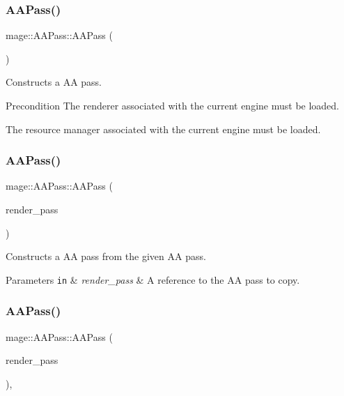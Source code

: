 \subsubsection{\texorpdfstring{A\+A\+Pass()}{AAPass()}\hspace{0.1cm}{\footnotesize\ttfamily [1/3]}}
{\footnotesize\ttfamily mage\+::\+A\+A\+Pass\+::\+A\+A\+Pass (\begin{DoxyParamCaption}{ }\end{DoxyParamCaption})}

Constructs a AA pass.

\begin{DoxyPrecond}{Precondition}
The renderer associated with the current engine must be loaded. 

The resource manager associated with the current engine must be loaded. 
\end{DoxyPrecond}
\hypertarget{classmage_1_1_a_a_pass_ad51f0e6fb81fe0f61f9e1eddb5571f98}{}\label{classmage_1_1_a_a_pass_ad51f0e6fb81fe0f61f9e1eddb5571f98} 
\subsubsection{\texorpdfstring{A\+A\+Pass()}{AAPass()}\hspace{0.1cm}{\footnotesize\ttfamily [2/3]}}
{\footnotesize\ttfamily mage\+::\+A\+A\+Pass\+::\+A\+A\+Pass (\begin{DoxyParamCaption}\item[{const \hyperlink{classmage_1_1_a_a_pass}{A\+A\+Pass} \&}]{render\+\_\+pass }\end{DoxyParamCaption})\hspace{0.3cm}{\ttfamily [delete]}}

Constructs a AA pass from the given AA pass.


\begin{DoxyParams}[1]{Parameters}
\mbox{\tt in}  & {\em render\+\_\+pass} & A reference to the AA pass to copy. \\
\hline
\end{DoxyParams}
\hypertarget{classmage_1_1_a_a_pass_a8413c0094a0393c48c33b1beb20caffd}{}\label{classmage_1_1_a_a_pass_a8413c0094a0393c48c33b1beb20caffd} 
\subsubsection{\texorpdfstring{A\+A\+Pass()}{AAPass()}\hspace{0.1cm}{\footnotesize\ttfamily [3/3]}}
{\footnotesize\ttfamily mage\+::\+A\+A\+Pass\+::\+A\+A\+Pass (\begin{DoxyParamCaption}\item[{\hyperlink{classmage_1_1_a_a_pass}{A\+A\+Pass} \&\&}]{render\+\_\+pass }\end{DoxyParamCaption})\hspace{0.3cm}{\ttfamily [default]}, {\ttfamily [noexcept]}}

